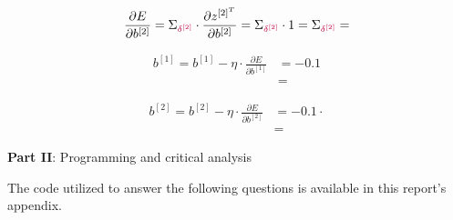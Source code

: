 \documentclass[12pt]{article}
\begin{document}
\begin{enumerate}[leftmargin=\labelsep]
        \begin{equation*}
          \frac{\partial E}{\partial b^{[2]}} = \Sigma_{\textcolor{purple}{\delta^{[2]}}} \cdot
          \frac{\partial z^{[2]^T}}{\partial b^{[2]}}
          = \Sigma_{\textcolor{purple}{\delta^{[2]}}} \cdot 1
          = \Sigma_{\textcolor{purple}{\delta^{[2]}}}
          = 
        \end{equation*}

        \begin{equation*}
          \begin{aligned}
            b^{[1]} = b^{[1]} - \eta \cdot \frac{\partial E}{\partial b^{[1]}}
             & =  - 0.1  \\
             & = 
          \end{aligned}
        \end{equation*}

        \begin{equation*}
          \begin{aligned}
            b^{[2]} = b^{[2]} - \eta \cdot \frac{\partial E}{\partial b^{[2]}}
             & =  - 0.1 \cdot  \\
             & = 
          \end{aligned}
        \end{equation*}

\end{enumerate}

\pagebreak

\center\large{\textbf{Part II}: Programming and critical analysis}

\begin{justify}
  The code utilized to answer the following questions is available in this
  report's appendix.
\end{justify}
\end{document}
